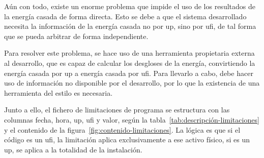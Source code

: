Aún con todo, existe un enorme problema que impide el uso de los resultados de la energía casada de forma directa. Esto se debe a que el sistema desarrollado necesita la información de la energía casada no por \gls{up}, sino por \gls{ufi}, de tal forma que se pueda arbitrar de forma independiente.

Para resolver este problema, se hace uso de una herramienta propietaria externa al desarrollo, que es capaz de calcular los desgloses de la energía, convirtiendo la energía casada por \gls{up} a energía casada por \gls{ufi}. Para llevarlo a cabo, debe hacer uso de información no disponible por el desarrollo, por lo que la existencia de una herramienta del estilo es necesaria.

Junto a ello, el fichero de limitaciones de programa se estructura con las columnas fecha, hora, \gls{up}, \gls{ufi} y valor, según la tabla~\ref{tab:descripción-limitaciones} y el contenido de la figura~\ref{fig:contenido-limitaciones}. La lógica es que si el código es un \gls{ufi}, la limitación aplica exclusivamente a ese activo físico, si es un \gls{up}, se aplica a la totalidad de la instalación.

